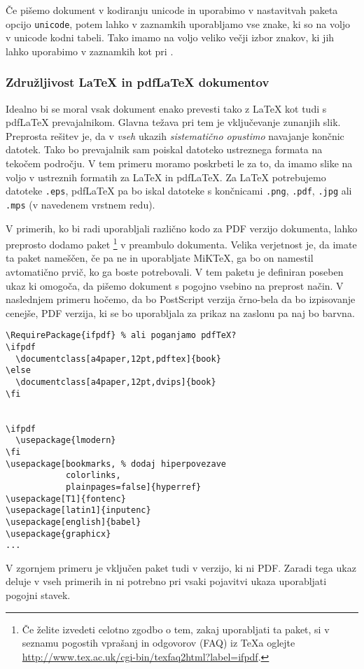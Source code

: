 Če pišemo dokument v kodiranju unicode in uporabimo v 
nastavitvah paketa  opcijo \verb+unicode+,
potem lahko v zaznamkih uporabljamo vse znake, ki so na voljo 
v unicode kodni tabeli. Tako imamo na voljo veliko večji izbor
znakov, ki jih lahko uporabimo v zaznamkih kot pri
.

\subsubsection{Združljivost \LaTeX{} in pdf\LaTeX{} dokumentov}
\label{sec:pdfcompat}

Idealno bi se moral vsak dokument enako prevesti tako z \LaTeX{}  
kot tudi s pdf\LaTeX{} prevajalnikom. Glavna težava pri tem je vključevanje
zunanjih slik. Preprosta rešitev je, da v \emph{vseh} ukazih
 \emph{sistematično opustimo} navajanje končnic datotek.   
Tako bo prevajalnik sam poiskal datoteko ustreznega formata na tekočem 
področju. V tem primeru moramo poskrbeti le za to, da imamo slike na voljo
v ustreznih formatih za \LaTeX{} in pdf\LaTeX{}. Za \LaTeX{} potrebujemo
datoteke \texttt{.eps},  pdf\LaTeX{} pa bo iskal datoteke s končnicami
\texttt{.png}, \texttt{.pdf}, \texttt{.jpg} ali \texttt{.mps}
(v navedenem vrstnem redu).

V primerih, ko bi radi uporabljali različno kodo za PDF verzijo
dokumenta, lahko preprosto dodamo paket %
\footnote{Če želite izvedeti celotno zgodbo o tem, zakaj
uporabljati ta paket, si v seznamu pogostih vprašanj in
odgovorov (FAQ) iz \TeX{}a oglejte\\
   \url{http://www.tex.ac.uk/cgi-bin/texfaq2html?label=ifpdf}.} v
preambulo dokumenta. Velika verjetnost je, da imate ta 
paket nameščen, če pa ne in uporabljate  MiK\TeX{}, ga bo on namestil
avtomatično prvič, ko ga boste potrebovali. V tem paketu je
definiran poseben ukaz  ki omogoča, da pišemo dokument s
pogojno vsebino na preprost način. V naslednjem primeru hočemo, da 
bo PostScript verzija črno-bela da bo izpisovanje cenejše, PDF
verzija, ki se bo uporabljala za prikaz na zaslonu pa naj bo barvna.
\begin{code}
\begin{verbatim}
\RequirePackage{ifpdf} % ali poganjamo pdfTeX?
\ifpdf
  \documentclass[a4paper,12pt,pdftex]{book}
\else
  \documentclass[a4paper,12pt,dvips]{book}
\fi


\ifpdf
  \usepackage{lmodern}
\fi
\usepackage[bookmarks, % dodaj hiperpovezave
            colorlinks,
            plainpages=false]{hyperref}                    
\usepackage[T1]{fontenc}
\usepackage[latin1]{inputenc}
\usepackage[english]{babel}
\usepackage{graphicx}
...
\end{verbatim}
\end{code}
V zgornjem primeru je vključen paket  tudi v verzijo,
ki ni PDF. Zaradi tega ukaz  deluje
v vseh primerih in ni potrebno pri vsaki pojavitvi ukaza uporabljati
pogojni stavek.

